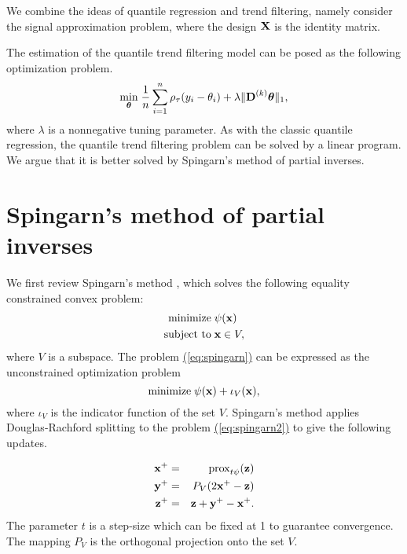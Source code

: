 \documentclass{article}
\newcommand{\Eqn}[1]{\hyperref[eq:#1]{{\rm (\ref*{eq:#1})}}} %
\newcommand{\Eqn}[1]{{(\ref{eq:#1})}} %
\newcommand{\V}[1]{{\bm{\mathbf{\MakeLowercase{#1}}}}} %
\newcommand{\VE}[2]{\MakeLowercase{#1}_{#2}} %
\newcommand{\M}[1]{{\bm{\mathbf{\MakeUppercase{#1}}}}} %
\newcommand{\Mn}[2]{\M{#1}^{(#2)}} %
\newcommand{\prox}[2]{\operatorname{prox}_{#1}({#2})}
\begin{document}
We combine the ideas of quantile regression and trend filtering, namely consider the signal approximation problem, where the design $\M{X}$ is the identity matrix.

The estimation of the quantile trend filtering model can be posed as the following optimization problem.
\begin{eqnarray}
\label{eq:quantile_trend}
	\underset{\V{\theta}}{\min}\; \frac{1}{n} \sum_{i=1}^n \rho_\tau(\VE{y}{i} - \VE{\theta}{i}) + \lambda \lVert \Mn{D}{k} \V{\theta} \rVert_1,
\end{eqnarray}
where $\lambda$ is a nonnegative tuning parameter. As with the classic quantile regression, the quantile trend filtering problem can be solved by a linear program. We argue that it is better solved by Spingarn's method of partial inverses.

\section{Spingarn's method of partial inverses}

We first review Spingarn's method \cite{Spingarn1985}, which solves the following equality constrained convex problem:
\begin{equation}
\label{eq:spingarn}
\begin{split}
\text{minimize}\; & \psi(\V{x}) \\
\text{subject to}\; & \V{x} \in V,
\end{split}
\end{equation}
where $V$ is a subspace. The problem \Eqn{spingarn} can be expressed as the unconstrained optimization problem
\begin{equation}
\label{eq:spingarn2}
\text{minimize}\; \psi(\V{x}) + \iota_V(\V{x}),
\end{equation}
where $\iota_V$ is the indicator function of the set $V$. Spingarn's method applies Douglas-Rachford splitting to the problem \Eqn{spingarn2} to give the following updates.

\begin{eqnarray*}
\V{x}^+ & = & \prox{t\psi}{\V{z}} \\
\V{y}^+ & = & P_V(2\V{x}^+ - \V{z}) \\
\V{z}^+ & = & \V{z} + \V{y}^+ - \V{x}^+.
\end{eqnarray*}
The parameter $t$ is a step-size which can be fixed at 1 to guarantee convergence. The mapping $P_V$ is the orthogonal projection onto the set $V$.
\end{document}
